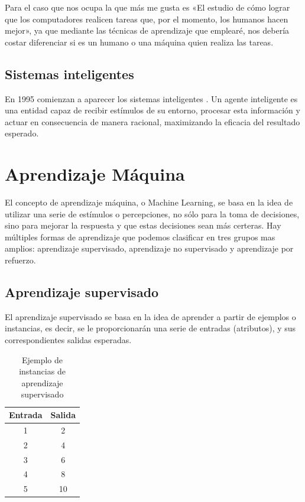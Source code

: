 Para el caso que nos ocupa la que más me gusta es «El estudio de cómo lograr que los computadores realicen tareas que, por el momento, los humanos hacen mejor», ya que mediante las técnicas de aprendizaje que emplearé, nos debería costar diferenciar si es un humano o una máquina quien realiza las tareas.

\subsection{Sistemas inteligentes}
 En 1995 comienzan a aparecer los sistemas inteligentes \cite{wiki:Agente_Inteligente}. Un agente inteligente es una entidad capaz de recibir estímulos de su entorno, procesar esta información y actuar en consecuencia de manera racional, maximizando la eficacia del resultado esperado.


\section{Aprendizaje Máquina}

El concepto de aprendizaje máquina, o Machine Learning, se basa en la idea de utilizar una serie de estímulos o percepciones, no sólo para la toma de decisiones, sino para mejorar la respuesta y que estas decisiones sean más certeras. Hay múltiples formas de aprendizaje que podemos clasificar en tres grupos mas amplios: aprendizaje supervisado, aprendizaje no supervisado y aprendizaje por refuerzo.


\subsection{Aprendizaje supervisado}

El aprendizaje supervisado se basa en la idea de aprender a partir de ejemplos o instancias, es decir, se le proporcionarán una serie de entradas (atributos), y sus correspondientes salidas esperadas.

\begin{table}[h]
\centering
\begin{tabular}{|c|c|}
\hline
\rowcolor[HTML]{C0C0C0} 
Entrada & Salida \\ \hline
1       & 2      \\ \hline
2       & 4      \\ \hline
3       & 6      \\ \hline
4       & 8     \\ \hline
5       & 10     \\ \hline
\end{tabular}
\caption{Ejemplo de instancias de aprendizaje supervisado}
\label{aprendizaje_supervidado}
\end{table}

